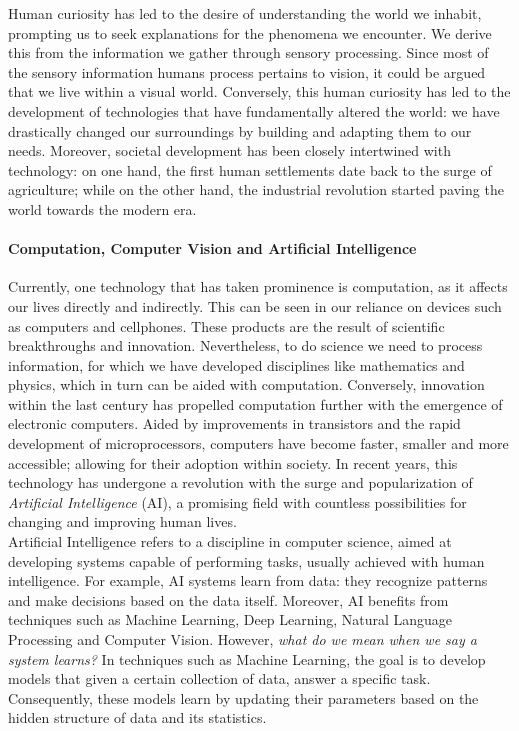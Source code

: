 Human curiosity has led to the desire of understanding the world we inhabit, prompting us to seek
explanations for the phenomena we encounter. We derive this from the information we gather through 
sensory processing. Since most of the sensory information humans process pertains 
to vision, it could be argued that we live within a visual world. Conversely, this human curiosity 
has led to the development of technologies that have fundamentally altered the world: we have 
drastically changed our surroundings by building and adapting them to our needs. Moreover, societal 
development has been closely intertwined with technology: on one hand, the first human settlements 
date back to the surge of agriculture; while on the other hand, the industrial revolution started 
paving the world towards the modern era.\\

\paragraph{Computation, Computer Vision and Artificial Intelligence} Currently, one technology that 
has taken prominence is computation, as it affects our lives directly and indirectly. This can be 
seen in our reliance on devices such as computers and  cellphones. These products are the result of 
scientific breakthroughs and innovation. Nevertheless, to do science we need to process 
information, for which we have developed disciplines like mathematics and physics, which in turn 
can be aided with computation. Conversely, innovation within the last century has propelled 
computation further with the emergence of electronic computers. Aided by improvements in 
transistors and the rapid development of microprocessors, computers have become faster, smaller and 
more accessible; allowing for their adoption within society. In recent years, this technology has 
undergone a revolution with the surge and popularization of \emph{Artificial Intelligence} (AI), 
a promising field with countless possibilities for changing and improving human lives.\\

\noindent Artificial Intelligence refers to a discipline in computer science, aimed at developing 
systems capable of performing tasks, usually achieved with human intelligence. For example, AI 
systems learn from data: they recognize patterns and make decisions based on the data itself. 
Moreover, AI benefits from techniques such as Machine Learning, Deep Learning, Natural Language 
Processing and Computer Vision. However, \emph{what do we mean when we say a system learns?} In 
techniques such as Machine Learning, the goal is to develop models that given a certain collection 
of data, answer a specific task. Consequently, these models learn by updating their parameters 
based on the hidden structure of data and its statistics.\\

